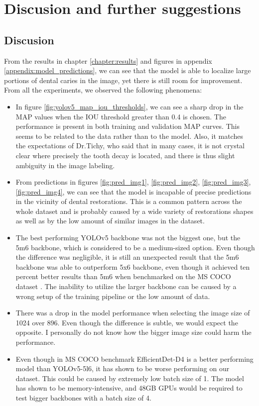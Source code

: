 \chapter{Discusion and further suggestions}
\section{Discusion}
From the results in chapter \ref{chapter:results} and figures in appendix \ref{appendix:model_predictions}, we can see that the model is able to localize large portions of dental caries in the image, yet there is still room for improvement. From all the experiments, we observed the following phenomena:
\begin{itemize}
    \item In figure \ref{fig:yolov5_map_iou_thresholds}, we can see a sharp drop in the MAP values when the IOU threshold greater than 0.4 is chosen. The performance is present in both training and validation MAP curves. This seems to be related to the data rather than to the model. Also, it matches the expectations of Dr.Tichy, who said that in many cases, it is not crystal clear where precisely the tooth decay is located, and there is thus slight ambiguity in the image labeling.
    \item From predictions in figures \ref{fig:pred_img1}, \ref{fig:pred_img2}, \ref{fig:pred_img3}, \ref{fig:pred_img4}, we can see that the model is incapable of precise predictions in the vicinity of dental restorations. This is a common pattern across the whole dataset and is probably caused by a wide variety of restorations shapes as well as by the low amount of similar images in the dataset.
    \item The best performing YOLOv5 backbone was not the biggest one, but the 5m6 backbone, which is considered to be a medium-sized option. Even though the difference was negligible, it is still an unexpected result that the 5m6 backbone was able to outperform 5x6 backbone, even though it achieved ten percent better results than 5m6 when benchmarked on the MS COCO dataset \cite{glennjocher2020}. The inability to utilize the larger backbone can be caused by a wrong setup of the training pipeline or the low amount of data.
    \item There was a drop in the model performance when selecting the image size of 1024 over 896. Even though the difference is subtle, we would expect the opposite. I personally do not know how the bigger image size could harm the performance.
    \item Even though in MS COCO benchmark EfficientDet-D4 is a better performing model than YOLOv5-5l6, it has shown to be worse performing on our dataset. This could be caused by extremely low batch size of 1. The model has shown to be memory-intensive, and 48GB GPUs would be required to test bigger backbones with a batch size of 4.
\end{itemize}

